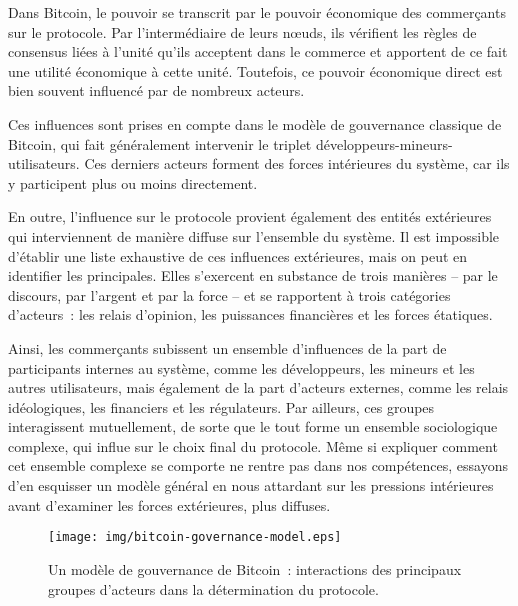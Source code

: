 Dans Bitcoin, le pouvoir se transcrit par le pouvoir économique des commerçants sur le protocole. Par l'intermédiaire de leurs nœuds, ils vérifient les règles de consensus liées à l'unité qu'ils acceptent dans le commerce et apportent de ce fait une utilité économique à cette unité. Toutefois, ce pouvoir économique direct est bien souvent influencé par de nombreux acteurs.

Ces influences sont prises en compte dans le modèle de gouvernance classique de Bitcoin, qui fait généralement intervenir le triplet développeurs-mineurs-utilisateurs. Ces derniers acteurs forment des forces intérieures du système, car ils y participent plus ou moins directement.

En outre, l'influence sur le protocole provient également des entités extérieures qui interviennent de manière diffuse sur l'ensemble du système. Il est impossible d'établir une liste exhaustive de ces influences extérieures, mais on peut en identifier les principales. Elles s'exercent en substance de trois manières -- par le discours, par l'argent et par la force -- et se rapportent à trois catégories d'acteurs~: les relais d'opinion, les puissances financières et les forces étatiques.

Ainsi, les commerçants subissent un ensemble d'influences de la part de participants internes au système, comme les développeurs, les mineurs et les autres utilisateurs, mais également de la part d'acteurs externes, comme les relais idéologiques, les financiers et les régulateurs. Par ailleurs, ces groupes interagissent mutuellement, de sorte que le tout forme un ensemble sociologique complexe, qui influe sur le choix final du protocole. Même si expliquer comment cet ensemble complexe se comporte ne rentre pas dans nos compétences, essayons d'en esquisser un modèle général en nous attardant sur les pressions intérieures avant d'examiner les forces extérieures, plus diffuses.

\begin{figure}[h]
  \centering
  \texttt{[image: img/bitcoin-governance-model.eps]}
  \caption{Un modèle de gouvernance de Bitcoin~: interactions des principaux groupes d'acteurs dans la détermination du protocole.}
\end{figure}

